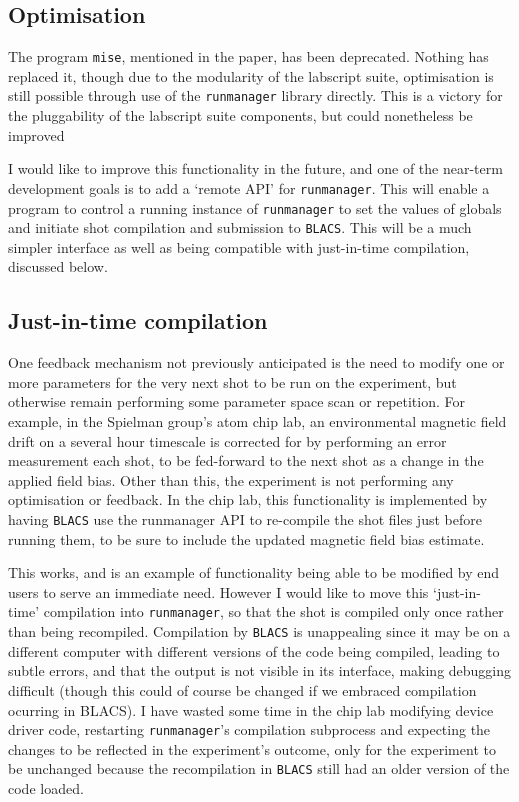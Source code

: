 \subsection{Optimisation}

The program \texttt{mise}, mentioned in the paper, has been deprecated. Nothing has replaced it, though due to the modularity of the labscript suite, optimisation is still possible through use of the \texttt{runmanager} library directly. This is a victory for the pluggability of the labscript suite components, but could nonetheless be improved

I would like to improve this functionality in the future, and one of the near-term development goals is to add a `remote API' for \texttt{runmanager}. This will enable a program to control a running instance of \texttt{runmanager} to set the values of globals and initiate shot compilation and submission to \texttt{BLACS}. This will be a much simpler interface as well as being compatible with just-in-time compilation, discussed below.

\subsection{Just-in-time compilation}

One feedback mechanism not previously anticipated is the need to modify one or more parameters for the very next shot to be run on the experiment, but otherwise remain performing some parameter space scan or repetition. For example, in the Spielman group's atom chip lab, an environmental magnetic field drift on a several hour timescale is corrected for by performing an error measurement each shot, to be fed-forward to the next shot as a change in the applied field bias. Other than this, the experiment is not performing any optimisation or feedback. In the chip lab, this functionality is implemented by having \texttt{BLACS} use the runmanager API to re-compile the shot files just before running them, to be sure to include the updated magnetic field bias estimate. 

This works, and is an example of functionality being able to be modified by end users to serve an immediate need. However I would like to move this `just-in-time' compilation into \texttt{runmanager}, so that the shot is compiled only once rather than being recompiled. Compilation by \texttt{BLACS} is unappealing since it may be on a different computer with different versions of the code being compiled, leading to subtle errors, and that the output is not visible in its interface, making debugging difficult (though this could of course be changed if we embraced compilation ocurring in BLACS). I have wasted some time in the chip lab modifying device driver code, restarting \texttt{runmanager}'s compilation subprocess  and expecting the changes to be reflected in the experiment's outcome, only for the experiment to be unchanged because the recompilation in \texttt{BLACS} still had an older version of the code loaded.

